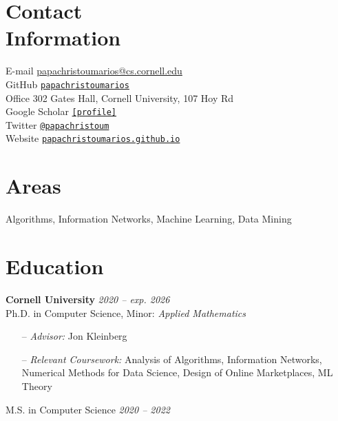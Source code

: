 \documentclass[margin]{res}
\newcommand{\field}[2]{\noindent \textbf{#1} \hfill #2 \\}
\newcommand{\specialurl}[2]{\href {#2} {\texttt{[#1]}}}
\begin{document}

\begin{resume}

\section{Contact \\ Information} 
E-mail \hfill \url{papachristoumarios@cs.cornell.edu} \\
GitHub \hfill \href{http://github.com/papachristoumarios}{\nolinkurl{papachristoumarios}} \\
Office \hfill 302 Gates Hall, Cornell University, 107 Hoy Rd \\
Google Scholar \hfill \specialurl{profile}{https://scholar.google.gr/citations?user=T12JO3MAAAAJ&hl=en} \\
Twitter \hfill \href{https://twitter.com/papachristoum}{\nolinkurl {@papachristoum}} \\
Website \hfill \href{https://papachristoumarios.github.io}{\nolinkurl {papachristoumarios.github.io}}

\section{Areas} Algorithms, Information Networks, Machine Learning, Data Mining

\section{Education}
\field {Cornell University} {\emph{2020 -- exp. 2026}}
Ph.D. in Computer Science, Minor: \emph{Applied Mathematics}
\begin{itemize}[nosep]    
\item[--] \emph{Advisor:} Jon Kleinberg
\item[--] \emph{Relevant Coursework:} Analysis of Algorithms, Information Networks, Numerical Methods for Data Science, Design of Online Marketplaces, ML Theory
\end{itemize} 

M.S. in Computer Science \hfill {\emph{2020 -- 2022}}
 

\end{resume}
\end{document}
